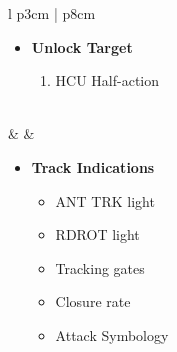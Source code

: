 \documentclass[8pt,usenames,dvipsnames,twoside]{article}
\begin{document}
\begin{center}
\begin{longtable}{l p{3cm} | p{8cm}}
\begin{minipage}[t]{\linewidth}
\begin{itemize}
						\item \textbf{Unlock Target}
						\begin{enumerate}[label=(\alph*), resume]
							\item HCU Half-action
						\end{enumerate}
					\end{itemize}
				\end{minipage} \\
				\midrule
				\textbullet &  & 
				\begin{minipage}[t]{\linewidth}
					\vspace{-7pt}
					\begin{itemize}
						\item \textbf{Track Indications}
						\begin{itemize}
							\item ANT TRK light
							\item RDROT light
							\item Tracking gates
							\item Closure rate 
							\item Attack Symbology
						\end{itemize}
					\end{itemize}
				\end{minipage} \\
				\bottomrule
			\end{longtable}
		\end{center}
	
\end{document}
